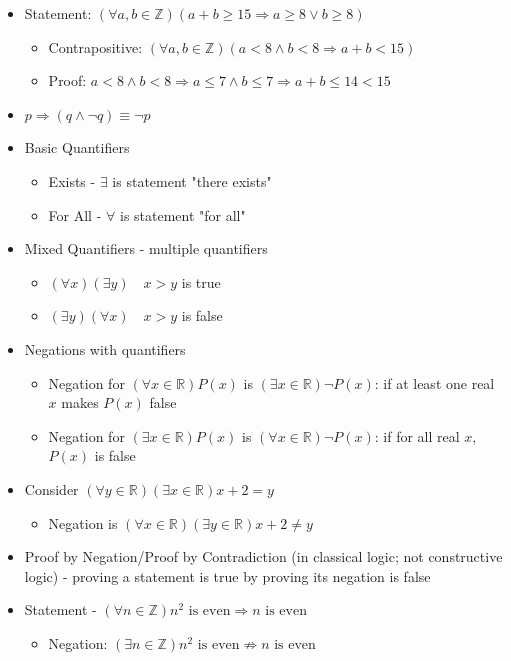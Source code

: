 \documentclass{article}
\begin{document}
\begin{itemize}
\begin{itemize}
    \end{itemize}
    \item Statement: $(\forall a,b \in \mathbb{Z})(a+b \ge 15 \Rightarrow a \ge 8 \vee b \ge 8)$
    \begin{itemize}
        \item Contrapositive: $(\forall a,b \in \mathbb{Z})(a < 8 \wedge b < 8 \Rightarrow a+b < 15)$
        \item Proof: $a < 8 \wedge b < 8 \Rightarrow a \le 7 \wedge b \le 7 \Rightarrow a+b \le 14 < 15$
    \end{itemize}
    \item $p \Rightarrow (q \wedge \neg q) \equiv \neg p$
    \item Basic Quantifiers
    \begin{itemize}
        \item Exists - $\exists$ is statement "there exists"
        \item For All - $\forall$ is statement "for all"
    \end{itemize}
    \item Mixed Quantifiers - multiple quantifiers
    \begin{itemize}
        \item $(\forall x)(\exists y) \quad x>y$ is true
        \item $(\exists y)(\forall x) \quad x>y$ is false
    \end{itemize}
    \item Negations with quantifiers
    \begin{itemize}
        \item Negation for $(\forall x \in \mathbb{R})P(x)$ is $(\exists x \in \mathbb{R})\neg P(x)$: if at least one real $x$ makes $P(x)$ false
        \item Negation for $(\exists x \in \mathbb{R})P(x)$ is $(\forall x \in \mathbb{R})\neg P(x)$: if for all real $x$, $P(x)$ is false
    \end{itemize}
    \item Consider $(\forall y \in \mathbb{R})(\exists x \in \mathbb{R}) x+2 = y$
    \begin{itemize}
        \item Negation is $(\forall x \in \mathbb{R})(\exists y \in \mathbb{R}) x+2 \neq y$
    \end{itemize}
    \item Proof by Negation/Proof by Contradiction (in classical logic; not constructive logic) - proving a statement is true by proving its negation is false
    \item Statement - $(\forall n \in \mathbb{Z}) n^2 \text{ is even} \Rightarrow n \text{ is even}$
    \begin{itemize}
        \item Negation: $(\exists n \in \mathbb{Z})n^2 \text{ is even} \nRightarrow n \text{ is even}$
    \end{itemize}
\end{itemize}
\end{document}
